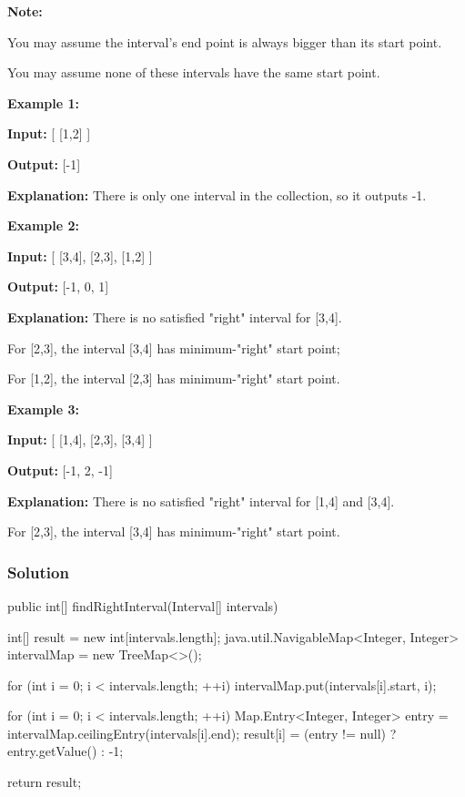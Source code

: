 \textbf{Note:}

You may assume the interval's end point is always bigger than its start point.

You may assume none of these intervals have the same start point.

\textbf{Example 1:}

\textbf{Input:} [ [1,2] ]

\textbf{Output:} [-1]

\textbf{Explanation:} There is only one interval in the collection, so it outputs -1.

\textbf{Example 2:}

\textbf{Input:} [ [3,4], [2,3], [1,2] ]

\textbf{Output:} [-1, 0, 1]

\textbf{Explanation:} There is no satisfied "right" interval for [3,4].

For [2,3], the interval [3,4] has minimum-"right" start point;

For [1,2], the interval [2,3] has minimum-"right" start point.

\textbf{Example 3:}

\textbf{Input:} [ [1,4], [2,3], [3,4] ]

\textbf{Output:} [-1, 2, -1]

\textbf{Explanation:} There is no satisfied "right" interval for [1,4] and [3,4].

For [2,3], the interval [3,4] has minimum-"right" start point.

\subsubsection{Solution}

\begin{Code}
public int[] findRightInterval(Interval[] intervals) {
    int[] result = new int[intervals.length];
    java.util.NavigableMap<Integer, Integer> intervalMap = new TreeMap<>();

    for (int i = 0; i < intervals.length; ++i) {
        intervalMap.put(intervals[i].start, i);
    }

    for (int i = 0; i < intervals.length; ++i) {
        Map.Entry<Integer, Integer> entry = intervalMap.ceilingEntry(intervals[i].end);
        result[i] = (entry != null) ? entry.getValue() : -1;
    }

    return result;
}
\end{Code}